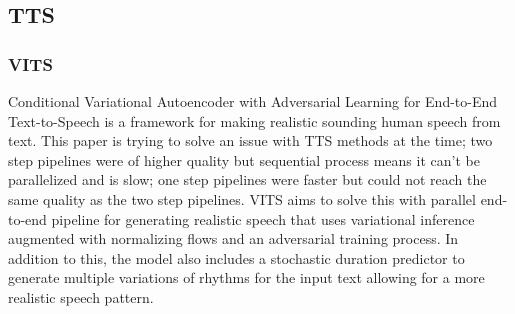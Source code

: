 \documentclass[conference]{IEEEtran}
\begin{document}

\subsection{TTS}

\subsubsection{VITS}
Conditional Variational Autoencoder with Adversarial Learning for End-to-End Text-to-Speech \cite{vits}
is a framework for making realistic sounding human speech from text. This paper is trying to solve an issue
with TTS methods at the time; two step pipelines were of higher quality but sequential process means it can't
be parallelized and is slow; one step pipelines were faster but could not reach the same quality as the two step
pipelines. VITS aims to solve this with parallel end-to-end pipeline for generating realistic speech that uses 
variational inference augmented with normalizing flows and an adversarial training process. In addition to this,
the model also includes a stochastic duration predictor to generate multiple variations of rhythms for the
input text allowing for a more realistic speech pattern.
\end{document}
